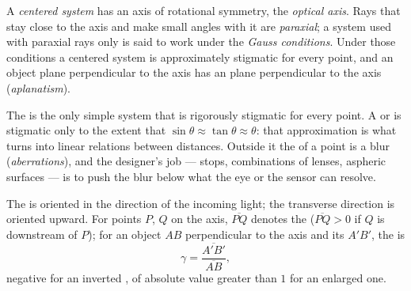\begin{definition}\label{def:b1:mirrors-thin-lenses:gauss}
A \emph{centered system} has an axis of rotational symmetry, the
\emph{optical axis}. Rays that stay close to the axis and make small
angles with it are \emph{paraxial}; a system used with paraxial rays
only is said to work under the \emph{Gauss conditions}. Under those
conditions a centered system is approximately stigmatic for every
point, and an object plane perpendicular to the axis has an 
plane perpendicular to the axis (\emph{aplanatism}).
\end{definition}
\admitted

\begin{remark}\label{rem:b1:mirrors-thin-lenses:why}
The  is the only simple system that is rigorously
stigmatic for every point. A  or  is stigmatic
only to the extent that $\sin\theta \approx \tan\theta \approx \theta$:
that approximation is what turns  into linear relations
between distances. Outside it the  of a point is a blur
(\emph{aberrations}), and the designer's job --- stops, combinations of
lenses, aspheric surfaces --- is to push the blur below what the eye or
the sensor can resolve.
\end{remark}

\begin{notation}\label{not:b1:mirrors-thin-lenses:signs}
The  is oriented in the direction of the incoming light;
the transverse direction is oriented upward. For points $P$, $Q$ on the
axis, $\overline{PQ}$ denotes the  ($\overline{PQ} > 0$
if $Q$ is downstream of $P$); for an object $AB$ perpendicular to the
axis and its  $A'B'$, the \emph{} is
\[
\gamma = \frac{\overline{A'B'}}{\overline{AB}} ,
\]
negative for an inverted , of absolute value greater than $1$ for an
enlarged one.
\end{notation}

